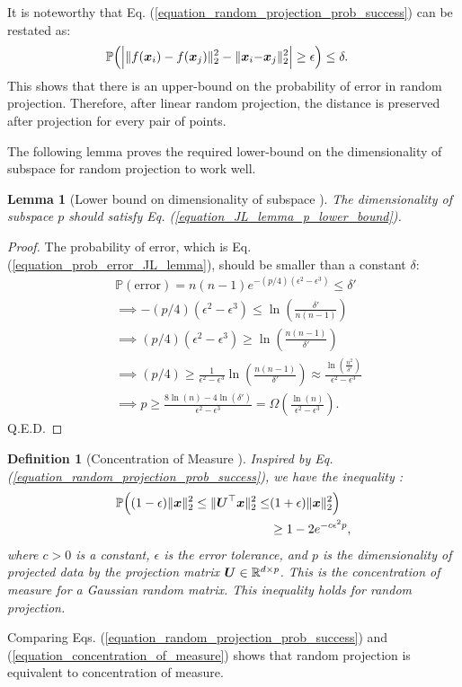 \documentclass{article}
\newtheorem{lemma}{Lemma}
\newtheorem{definition}{Definition}
\def\b{\ensuremath\boldsymbol}
\begin{document}
It is noteworthy that Eq. (\ref{equation_random_projection_prob_success}) can be restated as:
\begin{align}
\mathbb{P}\Big(
\Big| \|f(\b{x}_i) - f(\b{x}_j)\|_2^2 - \|\b{x}_i - &\b{x}_j\|_2^2 \Big| \geq \epsilon \Big) \leq \delta.
\end{align}
This shows that there is an upper-bound on the probability of error in random projection. Therefore, after linear random projection, the distance is preserved after projection for every pair of points. 

The following lemma proves the required lower-bound on the dimensionality of subspace for random projection to work well. 
\begin{lemma}[Lower bound on dimensionality of subspace \cite{indyk1998approximate}]
The dimensionality of subspace $p$ should satisfy Eq. (\ref{equation_JL_lemma_p_lower_bound}).
\end{lemma}
\begin{proof}
The probability of error, which is Eq. (\ref{equation_prob_error_JL_lemma}), should be smaller than a constant $\delta$:
\begin{align*}
&\mathbb{P}(\text{error}) = n(n-1) e^{-(p/4) (\epsilon^2 - \epsilon^3)} \leq \delta' \\
&\implies -(p/4) (\epsilon^2 - \epsilon^3) \leq \ln(\frac{\delta'}{n(n-1)}) \\
&\implies (p/4) (\epsilon^2 - \epsilon^3) \geq \ln(\frac{n(n-1)}{\delta'}) \\
&\implies (p/4) \geq \frac{1}{\epsilon^2 - \epsilon^3} \ln(\frac{n(n-1)}{\delta'}) \approx \frac{\ln(\frac{n^2}{\delta'})}{\epsilon^2 - \epsilon^3} \\
&\implies p \geq \frac{8\ln(n) - 4 \ln(\delta')}{\epsilon^2 - \epsilon^3} = \Omega(\frac{\ln(n)}{\epsilon^2 - \epsilon^3}).
\end{align*}
Q.E.D.
\end{proof}

\begin{definition}[Concentration of Measure \cite{talagrand1996new}]\label{definition_concentration_of_measure}
Inspired by Eq. (\ref{equation_random_projection_prob_success}), we have the inequality {\citep[Lemma A.1]{plan2013one}}:
\begin{align}
\mathbb{P}\Big((1-\epsilon) \|\b{x}\|_2^2 \leq \|\b{U}^\top \b{x}\|_2^2 \leq& (1+\epsilon) \|\b{x}\|_2^2\Big) \nonumber\\
&\geq 1 - 2e^{-c \epsilon^2 p}, \label{equation_concentration_of_measure}
\end{align}
where $c>0$ is a constant, $\epsilon$ is the error tolerance, and $p$ is the dimensionality of projected data by the projection matrix $\b{U} \in \mathbb{R}^{d \times p}$.
This is the concentration of measure for a Gaussian random matrix. This inequality holds for random projection.
\end{definition}
Comparing Eqs. (\ref{equation_random_projection_prob_success}) and (\ref{equation_concentration_of_measure}) shows that random projection is equivalent to concentration of measure.
\end{document}
